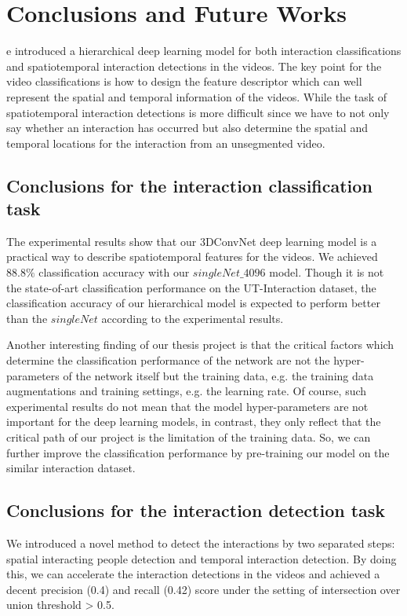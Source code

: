 %
%
\let\textcircled=\pgftextcircled
\chapter{Conclusions and Future Works}
\label{chap6}
e introduced a hierarchical deep learning model for both interaction classifications and spatiotemporal interaction detections in the videos. The key point for the video classifications is how to design the feature descriptor which can well represent the spatial and temporal information of the videos. While the task of spatiotemporal interaction detections is more difficult since we have to not only say whether an interaction has occurred but also determine the spatial and temporal locations for the interaction from an unsegmented video. 

\section{Conclusions for the interaction classification task}
\par 
The experimental results show that our 3DConvNet deep learning model is a practical way to describe spatiotemporal features for the videos. We achieved \(88.8\%\) classification accuracy with our \(singleNet\_4096\) model. Though it is not the state-of-art classification performance on the UT-Interaction dataset, the classification accuracy of our hierarchical model is expected to perform better than the \(singleNet\) according to the experimental results. 
\par 
Another interesting finding of our thesis project is that the critical factors which determine the classification performance of the network are not the hyper-parameters of the network itself but the training data, e.g. the training data augmentations and training settings, e.g. the learning rate. Of course, such experimental results do not mean that the model hyper-parameters are not important for the deep learning models, in contrast, they only reflect that the critical path of our project is the limitation of the training data. So, we can further improve the classification performance by pre-training our model on the similar interaction dataset.

\section{Conclusions for the interaction detection task}
\par 
We introduced a novel method to detect the interactions by two separated steps: spatial interacting people detection and temporal interaction detection. By doing this, we can accelerate the interaction detections in the videos and achieved a decent precision (0.4) and recall (0.42) score under the setting of intersection over union threshold > 0.5. 

